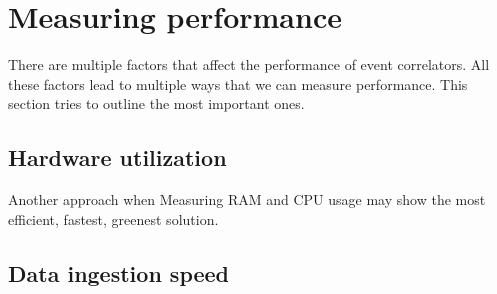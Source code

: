 \section{Measuring performance}
\label{sec:measuring-performance}
There are multiple factors that affect the performance of event correlators. All these factors lead to multiple ways that we can measure performance. This section tries to outline the most important ones.

\subsection{Hardware utilization}
\label{sub:hardware-utilization}
Another approach when 
Measuring RAM and CPU usage may show the most efficient, fastest, greenest solution.

\subsection{Data ingestion speed}
\label{sub:ingestion-speed}

